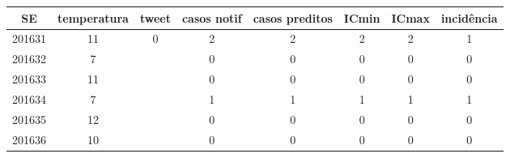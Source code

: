 \begin{tabular}{c|ccccccc}
  \hline
SE & temperatura & tweet & casos notif & casos preditos & ICmin & ICmax & incidência \\ 
  \hline
201631 & 11 & 0 & 2 & 2 & 2 & 2 & 1 \\ 
  201632 & 7 &  & 0 & 0 & 0 & 0 & 0 \\ 
  201633 & 11 &  & 0 & 0 & 0 & 0 & 0 \\ 
  201634 & 7 &  & 1 & 1 & 1 & 1 & 1 \\ 
  201635 & 12 &  & 0 & 0 & 0 & 0 & 0 \\ 
  201636 & 10 &  & 0 & 0 & 0 & 0 & 0 \\ 
   \hline
\end{tabular}

